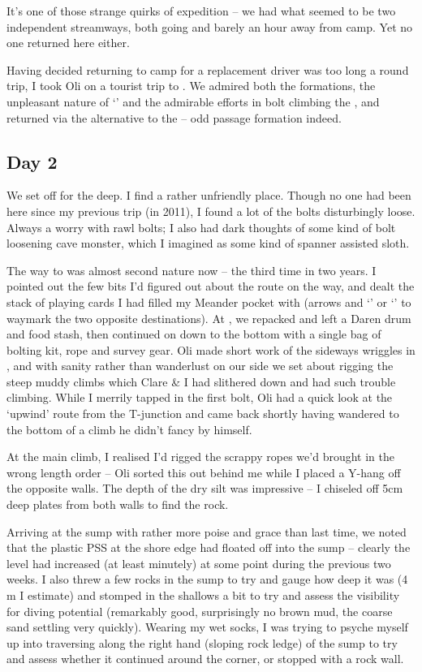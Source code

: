 It's one of those strange quirks of expedition -- we had what seemed to
be two independent streamways, both going and barely an hour away from
camp. Yet no one returned here either.

Having decided returning to camp for a replacement driver was too long a
round trip, I took Oli on a tourist trip to .
We admired both the formations, the unpleasant nature of
`' and the admirable efforts in bolt climbing the
, and returned via the  alternative to
the  -- odd passage formation indeed.


\subsection{Day 2}

We set off for the deep. I find  a rather unfriendly place.
Though no one had been here since my previous trip (in 2011), I found a
lot of the bolts disturbingly loose. Always a worry with rawl bolts; I
also had dark thoughts of some kind of bolt loosening cave monster,
which I imagined as some kind of spanner assisted sloth.

The way to  was almost second nature now -- the third time in two
years. I pointed out the few bits I'd figured out about the route on the
way, and dealt the stack of playing cards I had filled my Meander pocket
with (arrows and `' or `' to waymark the two opposite
destinations). At , we repacked and left a Daren drum and food
stash, then continued on down to the bottom with a single bag of bolting
kit, rope and survey gear. Oli made short work of the sideways wriggles
in , and with sanity rather than wanderlust on our
side we set about rigging the steep muddy climbs which Clare \& I had
slithered down and had such trouble climbing. While I merrily tapped in
the first bolt, Oli had a quick look at the `upwind' route from the
T-junction and came back shortly having wandered to the bottom of a
climb he didn't fancy by himself.

At the main climb, I realised I'd rigged the scrappy ropes we'd brought
in the wrong length order -- Oli sorted this out behind me while I
placed a Y-hang off the opposite walls. The depth of the dry silt was
impressive -- I chiseled off 5cm deep plates from both walls to find the
rock.

Arriving at the sump with rather more poise and grace than last time, we
noted that the plastic PSS at the shore edge had floated off into the
sump -- clearly the level had increased (at least minutely) at some
point during the previous two weeks. I also threw a few rocks in the
sump to try and gauge how deep it was (4 m I estimate) and stomped in
the shallows a bit to try and assess the visibility for diving potential
(remarkably good, surprisingly no brown mud, the coarse sand settling
very quickly). Wearing my wet socks, I was trying to psyche myself up
into traversing along the right hand (sloping rock ledge) of the sump to
try and assess whether it continued around the corner, or stopped with a
rock wall.

